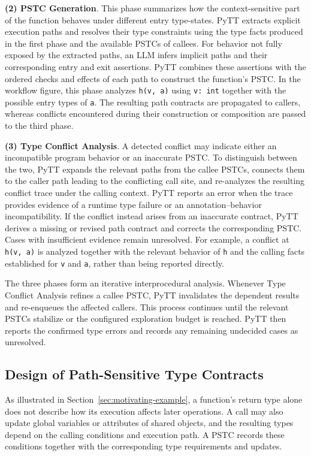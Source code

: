 \textbf{(2) PSTC Generation}. This phase summarizes how the
context-sensitive part of the function behaves under different entry
type-states. PyTT extracts explicit execution paths and resolves their type
constraints using the type facts produced in the first phase and the
available PSTCs of callees. For behavior not fully exposed by the extracted
paths, an LLM infers implicit paths and their
corresponding entry and exit assertions. PyTT combines these assertions with
the ordered checks and effects of each path to construct the function's
PSTC. In the workflow figure, this phase analyzes \texttt{h(v, a)} using
\texttt{v: int} together with the possible entry types of \texttt{a}.
The resulting path contracts are propagated to callers, whereas conflicts
encountered during their construction or composition are passed to the
third phase.

\textbf{(3) Type Conflict Analysis}. A detected conflict may indicate either
an incompatible program behavior or an inaccurate PSTC. To distinguish
between the two, PyTT expands the relevant paths from the callee PSTCs,
connects them to the caller path leading to the conflicting call site, and
re-analyzes the resulting conflict trace under the calling context. PyTT
reports an error when the trace provides evidence of a runtime type failure
or an annotation--behavior incompatibility. If the conflict instead arises
from an inaccurate contract, PyTT derives a missing or revised path contract
and corrects the corresponding PSTC. Cases with insufficient evidence
remain unresolved. For example, a conflict at \texttt{h(v, a)} is analyzed together
with the relevant behavior of \texttt{h} and the calling facts established
for \texttt{v} and \texttt{a}, rather than being reported directly.

The three phases form an iterative interprocedural analysis. Whenever Type
Conflict Analysis refines a callee PSTC, PyTT invalidates the dependent
results and re-enqueues the affected callers. This process continues until
the relevant PSTCs stabilize or the configured exploration budget is
reached. PyTT then reports the confirmed type errors and records any
remaining undecided cases as unresolved.


\subsection{Design of Path-Sensitive Type Contracts}
\label{sec:state-model}
As illustrated in Section~\ref{sec:motivating-example}, a function's return
type alone does not describe how its execution affects later operations.
A call may also update global variables or attributes of shared objects,
and the resulting types depend on the calling conditions and execution
path. A PSTC records these conditions together with the corresponding
type requirements and updates.

